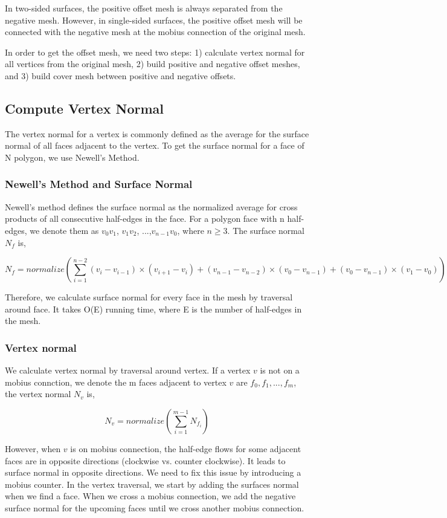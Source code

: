 \documentclass[12pt]{article}
\begin{document}
In two-sided surfaces, the positive offset mesh is always separated from the negative mesh. However, in single-sided surfaces, the positive offset mesh will be connected with the negative mesh at the mobius connection of the original mesh.

In order to get the offset mesh, we need two steps: 1) calculate vertex normal for all vertices from the original mesh, 2) build positive and negative offset meshes, and 3) build cover mesh between positive and negative offsets.

\subsection{Compute Vertex Normal}
The vertex normal for a vertex is commonly defined as the average for the surface normal of all faces adjacent to the vertex. To get the surface normal for a face of N polygon, we use Newell's Method.

\subsubsection{Newell's Method and Surface Normal}
Newell's method defines the surface normal as the normalized average for cross products of all consecutive half-edges in the face. For a polygon face with n half-edges, we denote them as $v_0v_1$, $v_1v_2$, ...,$v_{n-1}v_0$, where $ n \ge 3$. The surface normal $N_{f}$ is,

$$N_{f} = normalize(\sum\limits_{i=1}^{n-2} (v_i - v_{i - 1}) \times (v_{i + 1} - v_{i}) + (v_{n - 1} - v_{n - 2}) \times (v_0 - v_{n - 1}) + (v_0 - v_{n - 1}) \times (v_1 - v_0))$$

Therefore, we calculate surface normal for every face in the mesh by traversal around face. It takes O(E) running time, where E is the number of half-edges in the mesh.

\subsubsection{Vertex normal}
We calculate vertex normal by traversal around vertex. If a vertex $v$ is not on a mobius connction, we denote the m faces adjacent to vertex $v$ are $f_0, f_1, ..., f_m$, the vertex normal $N_v$ is,

$$N_{v} = normalize(\sum\limits_{i=1}^{m-1} N_{f_i})$$

However, when $v$ is on mobius connection, the half-edge flows for some adjacent faces are in opposite directions (clockwise vs. counter clockwise). It leads to surface normal in opposite directions. We need to fix this issue by introducing a mobius counter. In the vertex traversal, we start by adding the surfaces normal when we find a face. When we cross a mobius connection, we add the negative surface normal for the upcoming faces until we cross another mobius connection.
\end{document}
